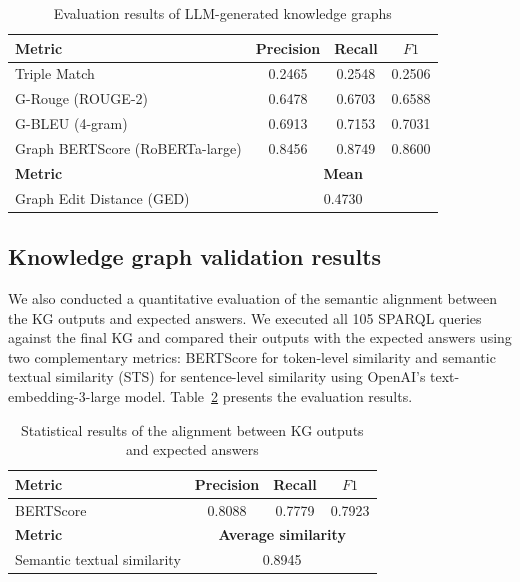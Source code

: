 \documentclass[preprint,12pt]{elsarticle}
\begin{document}
\begin{table}[ht]
\centering
\caption{Evaluation results of LLM-generated knowledge graphs} \label{tab3}
\begin{tabular}{|l|c|c|c|}
\hline
\textbf{Metric} & \textbf{Precision} & \textbf{Recall} & \textbf{$F1$} \\ \hline
Triple Match & 0.2465 & 0.2548 & 0.2506 \\ \hline
G-Rouge (ROUGE-2) & 0.6478 & 0.6703 & 0.6588 \\ \hline
G-BLEU (4-gram) & 0.6913 & 0.7153 & 0.7031 \\ \hline
Graph BERTScore (RoBERTa-large) & 0.8456 & 0.8749 & 0.8600 \\ \hline
\textbf{Metric} & \multicolumn{3}{c|}{\textbf{Mean}} \\ \hline
Graph Edit Distance (GED) & \multicolumn{3}{c|}{0.4730} \\ \hline
\end{tabular}
\end{table}


\subsection{Knowledge graph validation results}\label{sec4_3}
We also conducted a quantitative evaluation of the semantic alignment between the KG outputs and expected answers. We executed all 105 SPARQL queries against the final KG and compared their outputs with the expected answers using two complementary metrics: BERTScore \citep{Zhang*2020BERTScore:} for token-level similarity and semantic textual similarity (STS) \citep{cer-etal-2017-semeval} for sentence-level similarity using OpenAI's text-embedding-3-large model. Table~\ref{tab4} presents the evaluation results.

\begin{table}[ht]
\centering
\caption{Statistical results of the alignment between KG outputs and expected answers} \label{tab4}
\begin{tabular}{|l|ccc|}
\hline
\textbf{Metric}    & \multicolumn{1}{c|}{\textbf{Precision}} & \multicolumn{1}{c|}{\textbf{Recall}} & \textbf{$F1$} \\ \hline
BERTScore & \multicolumn{1}{c|}{0.8088}             & \multicolumn{1}{c|}{0.7779}          & 0.7923            \\ \hline
\textbf{Metric} & \multicolumn{3}{c|}{\textbf{Average similarity}} \\ \hline
Semantic textual similarity    & \multicolumn{3}{c|}{0.8945}                      \\ \hline
\end{tabular}
\end{table}
\end{document}
